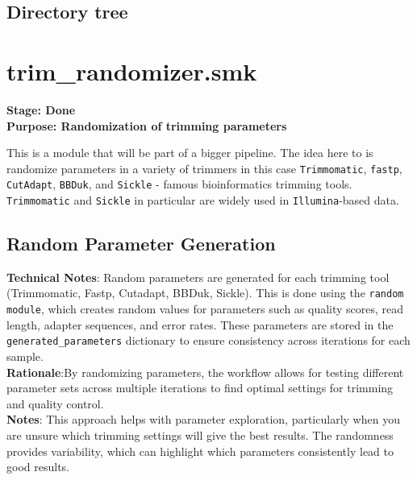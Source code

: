 \documentclass[11pt]{report}
\begin{document}
\subsection{Directory tree}


\newpage
\linenumbers*
\section{trim\_randomizer.smk}
\textbf{Stage: Done}   \\
\textbf{Purpose: Randomization of trimming parameters}

This is a module that will be part of a bigger pipeline. The idea here to is randomize parameters in a variety of trimmers in this case \texttt{Trimmomatic},
\texttt{fastp}, \texttt{CutAdapt}, \texttt{BBDuk}, and \texttt{Sickle} - famous bioinformatics trimming tools. \texttt{Trimmomatic} and \texttt{Sickle} in particular are widely used in \texttt{Illumina}-based data.\\ 

\subsection{Random Parameter Generation}
\textbf{Technical Notes}: Random parameters are generated for each trimming tool (Trimmomatic, Fastp, Cutadapt, BBDuk, Sickle). This is done using the \texttt{random module}, which creates random values for parameters such as quality scores, read length, adapter sequences, and error rates. These parameters are stored in the \texttt{generated\_parameters} dictionary to ensure consistency across iterations for each sample.\\
\textbf{Rationale}:By randomizing parameters, the workflow allows for testing different parameter sets across multiple iterations to find optimal settings for trimming and quality control.
\\ \textbf{Notes}: This approach helps with parameter exploration, particularly when you are unsure which trimming settings will give the best results. The randomness provides variability, which can highlight which parameters consistently lead to good results.
\end{document}
